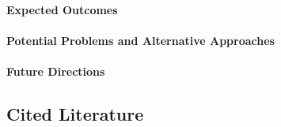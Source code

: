\begin{enumerate}
\begin{enumerate}
\begin{enumerate}
\paragraph{Expected Outcomes}\label{expected-outcomes}

\paragraph{Potential Problems and Alternative
      Approaches}\label{potential-problems-and-alternative-approaches}

\paragraph{Future Directions}\label{future-directions} 
    
\end{enumerate}
  
\end{enumerate}

\subsection{Cited Literature}\label{cited-literature}

\end{enumerate}